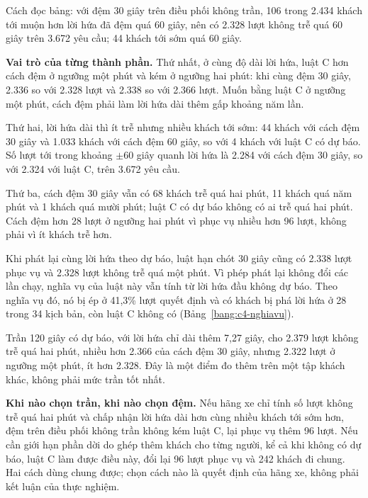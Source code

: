 Cách đọc bảng: với đệm 30 giây trên điều phối không trần, 106 trong 2.434 khách tới muộn hơn lời hứa đã đệm quá 60
giây, nên có 2.328 lượt không trễ quá 60 giây trên 3.672 yêu cầu; 44 khách tới sớm quá 60 giây.

\textbf{Vai trò của từng thành phần.} Thứ nhất, ở cùng độ dài lời hứa, luật C hơn cách đệm ở ngưỡng một phút và kém ở
ngưỡng hai phút: khi cùng đệm 30 giây, 2.336 so với 2.328 lượt và 2.338 so với 2.366 lượt. Muốn bằng luật C ở ngưỡng một phút,
cách đệm phải làm lời hứa dài thêm gấp khoảng năm lần.

Thứ hai, lời hứa dài thì ít trễ nhưng nhiều khách tới sớm: 44 khách với cách đệm 30 giây và 1.033 khách với cách đệm 60
giây, so với 4 khách với luật C có dự báo. Số lượt tới trong khoảng $\pm$60 giây quanh lời hứa là 2.284 với cách đệm 30
giây, so với 2.324 với luật C, trên 3.672 yêu cầu.

Thứ ba, cách đệm 30 giây vẫn có 68 khách trễ quá hai phút, 11 khách quá năm phút và 1 khách quá mười phút; luật C có
dự báo không có ai trễ quá hai phút. Cách đệm hơn 28 lượt ở ngưỡng hai phút vì phục vụ nhiều hơn 96 lượt, không phải vì
ít khách trễ hơn.

Khi phát lại cùng lời hứa theo dự báo, luật hạn chót 30 giây cũng có 2.338 lượt phục vụ và 2.328 lượt không trễ quá
một phút. Vì phép phát lại không đổi các lần chạy, nghĩa vụ của luật này vẫn tính từ lời hứa đầu không dự báo. Theo
nghĩa vụ đó, nó bị ép ở 41,3\% lượt quyết định và có khách bị phá lời hứa ở 28 trong 34 kịch bản, còn luật C không có
(Bảng~\ref{bang:c4-nghiavu}).

Trần 120 giây có dự báo, với lời hứa chỉ dài thêm 7,27 giây, cho 2.379 lượt không trễ quá hai phút, nhiều hơn 2.366
của cách đệm 30 giây, nhưng 2.322 lượt ở ngưỡng một phút, ít hơn 2.328. Đây là một điểm đo thêm trên một tập khách khác,
không phải mức trần tốt nhất.

\textbf{Khi nào chọn trần, khi nào chọn đệm.} Nếu hãng xe chỉ tính số lượt không trễ quá hai phút và chấp nhận lời hứa
dài hơn cùng nhiều khách tới sớm hơn, đệm trên điều phối không trần không kém luật C, lại phục vụ thêm 96 lượt. Nếu cần
giới hạn phần dời do ghép thêm khách cho từng người, kể cả khi không có dự báo, luật C làm được điều này, đổi lại 96
lượt phục vụ và 242 khách đi chung. Hai cách dùng chung được; chọn cách nào là quyết định của hãng xe, không phải kết
luận của thực nghiệm.

